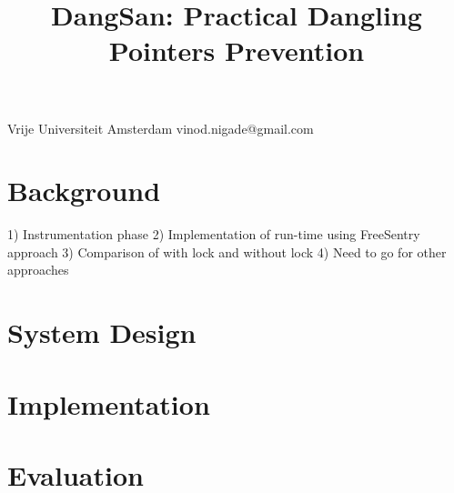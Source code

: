 \documentclass[preprint]{sigplanconf}
\begin{document}
\setlength{\pdfpageheight}{\paperheight}
\setlength{\pdfpagewidth}{\paperwidth}


\newcommand{\projectname}[0]{DangSan}


\title{DangSan: Practical Dangling Pointers Prevention}
           {Vrije Universiteit Amsterdam}
           {vinod.nigade@gmail.com}

\maketitle





\section{Background}
1) Instrumentation phase
2) Implementation of run-time using FreeSentry approach
3) Comparison of with lock and without lock
4) Need to go for other approaches

\section{System Design}

\section{Implementation}

\section{Evaluation}
\end{document}
